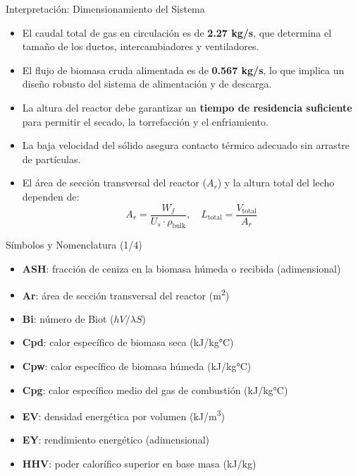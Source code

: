 \documentclass[main.tex]{subfiles}
\begin{document}
\begin{frame}{Interpretación: Dimensionamiento del Sistema}
\small
\begin{itemize}
  \item El caudal total de gas en circulación es de \textbf{2.27 kg/s}, que determina el tamaño de los ductos, intercambiadores y ventiladores.
  \item El flujo de biomasa cruda alimentada es de \textbf{0.567 kg/s}, lo que implica un diseño robusto del sistema de alimentación y de descarga.
  \item La altura del reactor debe garantizar un \textbf{tiempo de residencia suficiente} para permitir el secado, la torrefacción y el enfriamiento.
  \item La baja velocidad del sólido asegura contacto térmico adecuado sin arrastre de partículas.
  \item El área de sección transversal del reactor ($A_r$) y la altura total del lecho dependen de:
  \[
  A_r = \frac{W_f}{U_s \cdot \rho_{\text{bulk}}}, \quad L_{\text{total}} = \frac{V_{\text{total}}}{A_r}
  \]
\end{itemize}

\end{frame}


\begin{frame}{Símbolos y Nomenclatura (1/4)}
\footnotesize
\begin{itemize}
  \item \textbf{ASH}: fracción de ceniza en la biomasa húmeda o recibida (adimensional)
  \item \textbf{Ar}: área de sección transversal del reactor (m\textsuperscript{2})
  \item \textbf{Bi}: número de Biot ($hV/\lambda S$)
  \item \textbf{Cpd}: calor específico de biomasa seca (kJ/kg°C)
  \item \textbf{Cpw}: calor específico de biomasa húmeda (kJ/kg°C)
  \item \textbf{Cpg}: calor específico medio del gas de combustión (kJ/kg°C)
  \item \textbf{EV}: densidad energética por volumen (kJ/m\textsuperscript{3})
  \item \textbf{EY}: rendimiento energético (adimensional)
  \item \textbf{HHV}: poder calorífico superior en base masa (kJ/kg)
\end{itemize}
\end{frame}
\end{document}
